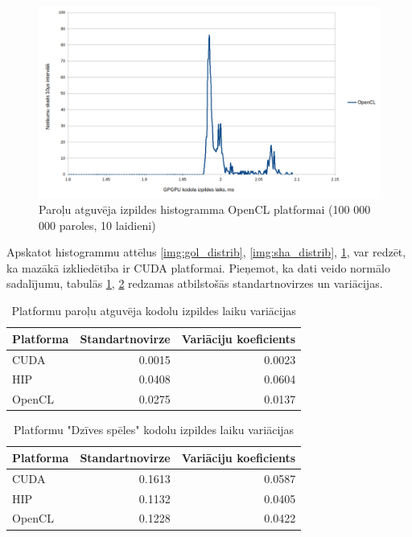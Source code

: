 \begin{figure}[H] \centering
    \includegraphics[width=\textwidth]{images/sha_distrib_opencl.png}
    \caption{Paroļu atguvēja izpildes histogramma OpenCL platformai (100 000
    000 paroles, 10 laidieni)} \label{img:sha_distrib_cl}
\end{figure}

Apskatot histogrammu attēlus \ref{img:gol_distrib}, \ref{img:sha_distrib},
\ref{img:sha_distrib_cl}, var redzēt, ka mazākā izkliedētība ir CUDA
platformai. Pieņemot, ka dati veido normālo sadalījumu, tabulās \ref{tab:kern},
\ref{tab:kernel_exec_time_variations_gol} redzamas atbilstošās standartnovirzes
un variācijas.


\begin{table}[H]
    \centering
    \begin{tabular}{lrr}
    \hline
    \textbf{Platforma} & \textbf{Standartnovirze} & \textbf{Variāciju koeficients}\\ \hline
    CUDA    & 0.0015 & 0.0023 \\
    HIP     & 0.0408 & 0.0604  \\
    OpenCL  & 0.0275 & 0.0137 \\
    \hline
    \end{tabular}
    \caption{Platformu paroļu atguvēja kodolu izpildes laiku variācijas}
    \label{tab:kern} 
\end{table}


\begin{table}[H]
    \centering
    \begin{tabular}{lrr}
    \hline
    \textbf{Platforma} & \textbf{Standartnovirze} & \textbf{Variāciju koeficients}\\ \hline
    CUDA    & 0.1613 & 0.0587 \\
    HIP     & 0.1132 & 0.0405  \\
    OpenCL  & 0.1228 & 0.0422 \\
    \hline
    \end{tabular}
    \caption{Platformu "Dzīves spēles" kodolu izpildes laiku variācijas}
    \label{tab:kernel_exec_time_variations_gol} 
\end{table}


